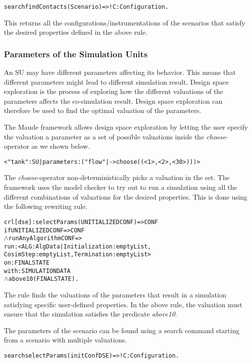 \begin{alltt}
  search findContacts(Scenario) =>! C:Configuration .
\end{alltt}
  
This returns all the configurations/instrumentations of the scenarios that satisfy the desired properties defined in the above rule.

\subsubsection{Parameters of the Simulation Units}
An SU may have different parameters affecting its behavior.
This means that different parameters might lead to different simulation result.
Design space exploration is the process of exploring how the different valuations of the parameters affects the co-simulation result.
Design space exploration can therefore be used to find the optimal valuation of the parameters. 

The Maude framework allows design space exploration by letting the user specify the valuation a parameter as a set of possible valuations inside the \emph{choose}-operator as we shown below.
\begin{alltt}
< "tank" : SU | parameters : ("flow" |-> choose((< 1 >,< 2 >,< 30 >))) >
\end{alltt}

The \emph{choose}-operator non-deterministically picks a valuation in the set.
The framework uses the model checker to try out to run a simulation using all the different combinations of valuations for the desired properties.
This is done using the following rewriting rule.

\begin{alltt}
  crl [dse] : selectParams(UNITIALIZEDCONF) => CONF 
  if UNITIALIZEDCONF => CONF
  \(\land\) runAnyAlgorithm CONF => 
      run: < ALG : AlgData | Initialization : emptyList, 
      CosimStep : emptyList, Termination : emptyList > 
      on: FINALSTATE
      with: SIMULATIONDATA
  \(\land\) above10(FINALSTATE) .
\end{alltt}

The rule finds the valuations of the parameters that result in a simulation satisfying specific user-defined properties.
In the above rule, the valuation must ensure that the simulation satisfies the predicate \emph{above10}.

The parameters of the scenario can be found using a search command starting from a scenario with multiple valuations.
\begin{alltt}
  search selectParams(initConfDSE)  =>! C:Configuration .
\end{alltt}

